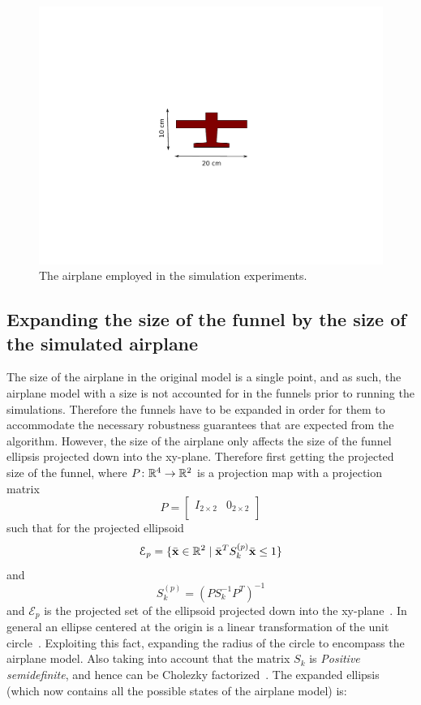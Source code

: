 \begin{figure}
  \centering \includegraphics[trim={5cm 5cm 5cm 5cm},
  width=\textwidth]{figures/experiments/radio-vehicle-model}
  \caption{The airplane employed in the simulation experiments.}
  \label{fig:radio-vehicle}
\end{figure}

\subsection{Expanding the size of the funnel by the size of the simulated
  airplane}
\label{subsec:expand-funnel}

The size of the airplane in the original model is a single point, and as such,
the airplane model with a size is not accounted for in the funnels prior to
running the simulations. Therefore the funnels have to be expanded in order for
them to accommodate the necessary robustness guarantees that are expected from
the algorithm. However, the size of the airplane only affects the size of the
funnel ellipsis projected down into the xy-plane. Therefore first getting the
projected size of the funnel, where \(P \colon \mathbb{R}^4 \rightarrow \mathbb{R}^2\) is a
projection map with a projection matrix
\[
  P =
  \begin{bmatrix}
    I_{2 \times 2} & {0}_{2 \times 2} \\
  \end{bmatrix}
\]
such that for the projected ellipsoid
\[
  \mathcal{E}_{p} = \lbrace\bar{\mathbf{x}} \in \mathbb{R}^{2} \mid
    {\bar{\mathbf{x}}}^{T}S_{k}^{(p)}\bar{\mathbf{x}} \leq 1\rbrace
\]
and
\[
  S_{k}^{(p)} = {\left( PS_{k}^{-1}P^T \right)}^{-1}
\]
and \(\mathcal{E}_{p}\) is the projected set of the ellipsoid projected down
into the xy-plane~\cite{majumdarFunnelLibrariesRealtime2017}. In general an
ellipse centered at the origin is a linear transformation of the unit
circle~\cite{lay2005linear}. Exploiting this fact, expanding the radius of the
circle to encompass the airplane model. Also taking into account that the matrix
\(S_{k}\) is \textit{Positive semidefinite}, and hence can be Cholezky
factorized~\cite{lay2005linear}. The expanded ellipsis (which now contains all
the possible states of the airplane model) is:

